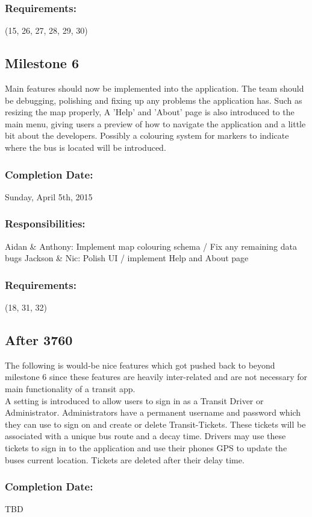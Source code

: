 \documentclass[a4paper,12pt]{article}
\begin{document}
\subsubsection{Requirements:} (15, 26, 27, 28, 29, 30)

\subsection{Milestone 6}
Main features should now be implemented into the application. The team should be debugging, polishing and fixing up any problems the application has. Such as resizing the map properly, A 'Help' and 'About' page is also introduced to the main menu, giving users a preview of how to navigate the application and a little bit about the developers. Possibly a colouring system for markers to indicate where the bus is located will be introduced.

\subsubsection{Completion Date:} Sunday, April 5th, 2015
\subsubsection{Responsibilities:}
Aidan \& Anthony: Implement map colouring schema / Fix any remaining data bugs
Jackson \& Nic: Polish UI / implement Help and About page
\subsubsection{Requirements:} (18, 31, 32)

\subsection{After 3760}
The following is would-be nice features which got pushed back to beyond milestone 6 since these features are heavily inter-related and are not necessary for main functionality of a transit app.
\\
A setting is introduced to allow users to sign in as a Transit Driver or Administrator. Administrators have a permanent username and password which they can use to sign on and create or delete Transit-Tickets. These tickets will be associated with a unique bus route and a decay time. Drivers may use these tickets to sign in to the application and use their phones GPS to update the buses current location. Tickets are deleted after their delay time.
\subsubsection{Completion Date:} TBD
\end{document}

